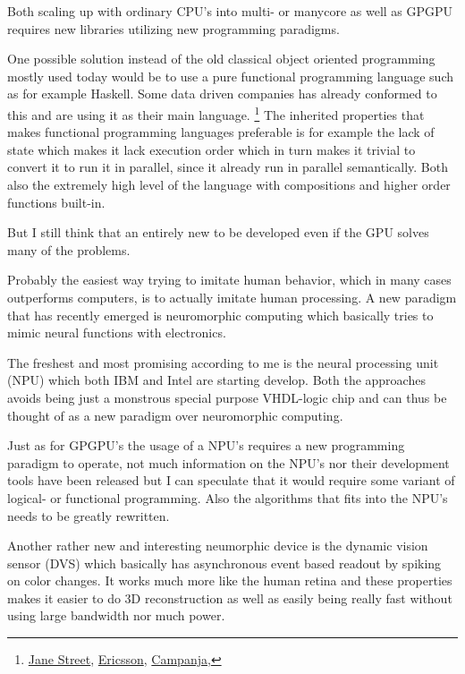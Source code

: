 \documentclass{article}
\begin{document}
    Both scaling up with ordinary CPU's into multi- or manycore as well as
    GPGPU requires new libraries utilizing new programming paradigms.

    One possible solution instead of the old classical object oriented
    programming mostly used today would be to use a pure functional programming
    language such as
    for example Haskell. Some data driven companies has
    already conformed to this and are using it as their main language.
    \footnote{
        \href{http://www.janestreet.com}{Jane Street},
        \href{http://www.ericsson.com}{Ericsson},
        \href{http://www.campanja.com}{Campanja},
    }
    The inherited properties that makes functional programming languages 
    preferable is for example the lack of state 
    which makes it lack execution order which in turn makes it
    trivial to convert it to run it in parallel, since it already run in parallel
    semantically. Both also the extremely high level of the language with
    compositions and higher order functions built-in.\cite{haskell}

    But I still think that an entirely new to be developed even if the GPU
    solves many of the problems.
    
    Probably the easiest way trying to imitate human behavior, which in many
    cases outperforms computers, is to actually
    imitate human processing. A new paradigm that has recently emerged is neuromorphic
    computing which basically tries to mimic neural functions with electronics.
    
    The freshest and most promising according to me is the 
    neural processing unit (NPU) which both IBM\cite{synapse} and
    Intel\cite{intelneuro} are starting develop. Both the approaches avoids being
    just a monstrous special purpose VHDL-logic chip and can thus be thought of
    as a new paradigm over neuromorphic computing.

    Just as for GPGPU's the usage of a NPU's requires a new programming paradigm to
    operate, not much information on the NPU's nor their development tools
    have been released but I can speculate that it would require some variant of
    logical- or functional programming. Also the algorithms that fits into the
    NPU's needs to be greatly rewritten.
    
    Another rather new and interesting neumorphic device is the
    dynamic vision sensor (DVS) which basically has asynchronous event based
    readout by spiking on color changes.\cite{dvs} It works much more like the human retina and
    these properties makes it easier to do 3D reconstruction as well as easily
    being really fast without using large bandwidth nor much power.
\end{document}
